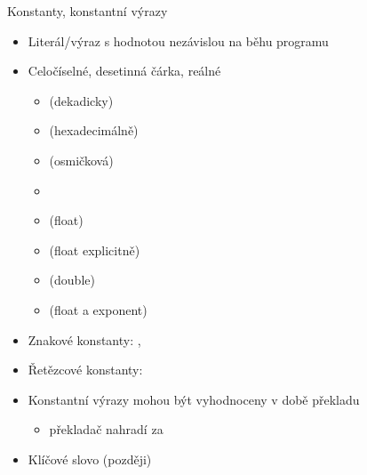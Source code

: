 \begin{frame}{Konstanty, konstantní výrazy}

  \begin{itemize}
    \item Literál/výraz s hodnotou nezávislou na běhu programu

    \pause

    \item Celočíselné, desetinná čárka, reálné
    \begin{itemize}
      \item {} (dekadicky)
      \item {} (hexadecimálně)
      \item {} (osmičková)

      \pause

      \item {}

      \pause

      \item {} (float)
      \item {} (float explicitně)
      \item {} (double)
      \item {} (float a exponent)
    \end{itemize}

    \pause

    \item Znakové konstanty: , 
    \item Řetězcové konstanty: 

    \pause

    \item Konstantní výrazy mohou být vyhodnoceny v době překladu
    \begin{itemize}
      \item {} překladač nahradí za 
    \end{itemize}

    \pause

    \item Klíčové slovo  (později)
  \end{itemize}

\end{frame}

